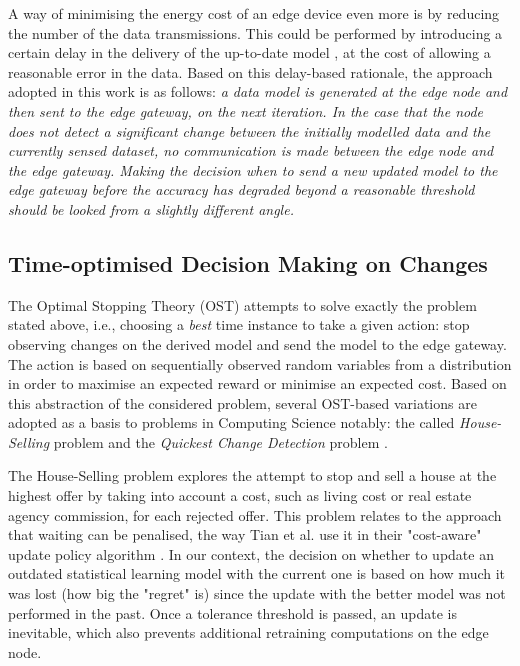 \documentclass{mpaper}
\begin{document}
A way of minimising the energy cost of an edge device even more is by reducing the number of the data transmissions. This could be performed by introducing a certain delay in the delivery of the up-to-date model \citep{anagnostop2014, anagnostop2016, anagnostopkolomvatos2016}, at the cost of allowing a reasonable error in the data. Based on this delay-based rationale, the approach adopted in this work is as follows: \textit{a data model is generated at the edge node and then sent to the edge gateway, on the next iteration. In the case that the node does not detect a significant change between the initially modelled data and the currently sensed dataset, 
no communication is made between the edge node and the edge gateway. 
Making the decision when to send a new updated model to the edge gateway before the accuracy has degraded beyond a reasonable threshold should be looked from a slightly different angle.} 

\subsection{Time-optimised Decision Making on Changes}
The Optimal Stopping Theory (OST) attempts to solve exactly the problem stated above, i.e., choosing a \textit{best} time instance to take a given action: 
stop observing changes on the derived model and send the model to the edge gateway. 
The action is based on sequentially observed random variables from a distribution in order to maximise an expected reward or minimise an expected cost. Based on this abstraction of the considered problem, several OST-based variations are adopted as a basis to problems in Computing Science notably: the called \emph{House-Selling} problem and the \emph{Quickest Change Detection} problem \cite{UCLAbook}.  

The House-Selling problem explores the attempt to stop and sell a house at the highest offer by taking into account a cost, such as living cost or real estate agency commission, for each rejected offer. 
This problem relates to the approach that waiting can be penalised, the way Tian et al. use it in their "cost-aware" update policy algorithm \cite{tian18}. In our context, the decision on whether to update an outdated statistical learning model with the current one is based on how much it was lost (how big the "regret" is) since the update with the better model was not performed in the past. 
Once a tolerance threshold is passed, an update is inevitable, which also prevents additional retraining computations on the edge node. 
\end{document}
